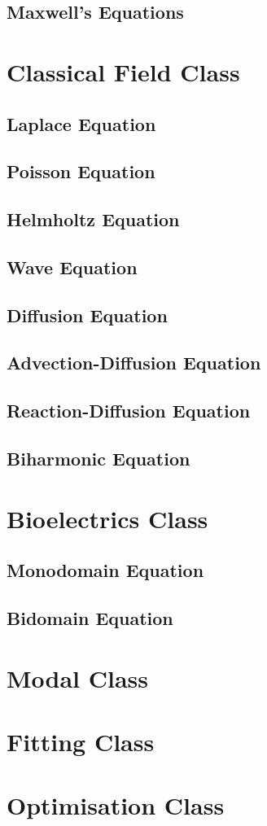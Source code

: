 \subsection{Maxwell's Equations}

\section{Classical Field Class}

\subsection{Laplace Equation}

\subsection{Poisson Equation}

\subsection{Helmholtz Equation}

\subsection{Wave Equation}

\subsection{Diffusion Equation}

\subsection{Advection-Diffusion Equation}

\subsection{Reaction-Diffusion Equation}

\subsection{Biharmonic Equation}

\section{Bioelectrics Class}

\subsection{Monodomain Equation}

\subsection{Bidomain Equation}
\section{Modal Class}

\section{Fitting Class}

\section{Optimisation Class}
